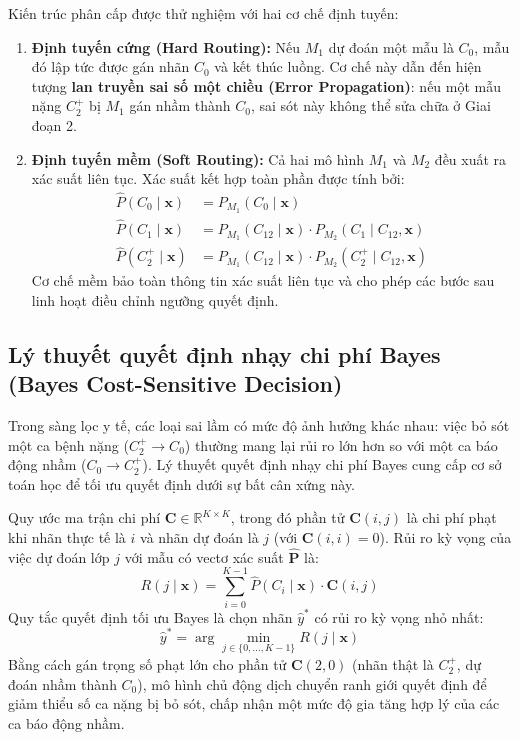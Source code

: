 Kiến trúc phân cấp được thử nghiệm với hai cơ chế định tuyến:
\begin{enumerate}
    \item \textbf{Định tuyến cứng (Hard Routing):} Nếu $M_1$ dự đoán một mẫu là $C_0$, mẫu đó lập tức được gán nhãn $C_0$ và kết thúc luồng. Cơ chế này dẫn đến hiện tượng \textbf{lan truyền sai số một chiều (Error Propagation)}: nếu một mẫu nặng $C_2^+$ bị $M_1$ gán nhầm thành $C_0$, sai sót này không thể sửa chữa ở Giai đoạn 2.
    \item \textbf{Định tuyến mềm (Soft Routing):} Cả hai mô hình $M_1$ và $M_2$ đều xuất ra xác suất liên tục. Xác suất kết hợp toàn phần được tính bởi:
    \begin{align}
        \hat{P}(C_0 \mid \mathbf{x}) &= P_{M_1}(C_0 \mid \mathbf{x}) \\
        \hat{P}(C_1 \mid \mathbf{x}) &= P_{M_1}(C_{12} \mid \mathbf{x}) \cdot P_{M_2}(C_1 \mid C_{12}, \mathbf{x}) \\
        \hat{P}(C_2^+ \mid \mathbf{x}) &= P_{M_1}(C_{12} \mid \mathbf{x}) \cdot P_{M_2}(C_2^+ \mid C_{12}, \mathbf{x})
    \end{align}
    Cơ chế mềm bảo toàn thông tin xác suất liên tục và cho phép các bước sau linh hoạt điều chỉnh ngưỡng quyết định.
\end{enumerate}

\subsection{Lý thuyết quyết định nhạy chi phí Bayes (Bayes Cost-Sensitive Decision)}
\label{subsec:cost-sensitive-paradigm}

Trong sàng lọc y tế, các loại sai lầm có mức độ ảnh hưởng khác nhau: việc bỏ sót một ca bệnh nặng ($C_2^+ \to C_0$) thường mang lại rủi ro lớn hơn so với một ca báo động nhầm ($C_0 \to C_2^+$). Lý thuyết quyết định nhạy chi phí Bayes \cite{elkan2001foundations} cung cấp cơ sở toán học để tối ưu quyết định dưới sự bất cân xứng này.

Quy ước ma trận chi phí $\mathbf{C} \in \mathbb{R}^{K \times K}$, trong đó phần tử $\mathbf{C}(i, j)$ là chi phí phạt khi nhãn thực tế là $i$ và nhãn dự đoán là $j$ (với $\mathbf{C}(i, i) = 0$). Rủi ro kỳ vọng của việc dự đoán lớp $j$ với mẫu có vectơ xác suất $\hat{\mathbf{P}}$ là:
\begin{equation}
    R(j \mid \mathbf{x}) = \sum_{i=0}^{K-1} \hat{P}(C_i \mid \mathbf{x}) \cdot \mathbf{C}(i, j)
\end{equation}
Quy tắc quyết định tối ưu Bayes là chọn nhãn $\hat{y}^*$ có rủi ro kỳ vọng nhỏ nhất:
\begin{equation}
    \hat{y}^* = \arg\min_{j \in \{0, \dots, K-1\}} R(j \mid \mathbf{x})
\end{equation}
Bằng cách gán trọng số phạt lớn cho phần tử $\mathbf{C}(2, 0)$ (nhãn thật là $C_2^+$, dự đoán nhầm thành $C_0$), mô hình chủ động dịch chuyển ranh giới quyết định để giảm thiểu số ca nặng bị bỏ sót, chấp nhận một mức độ gia tăng hợp lý của các ca báo động nhầm.

